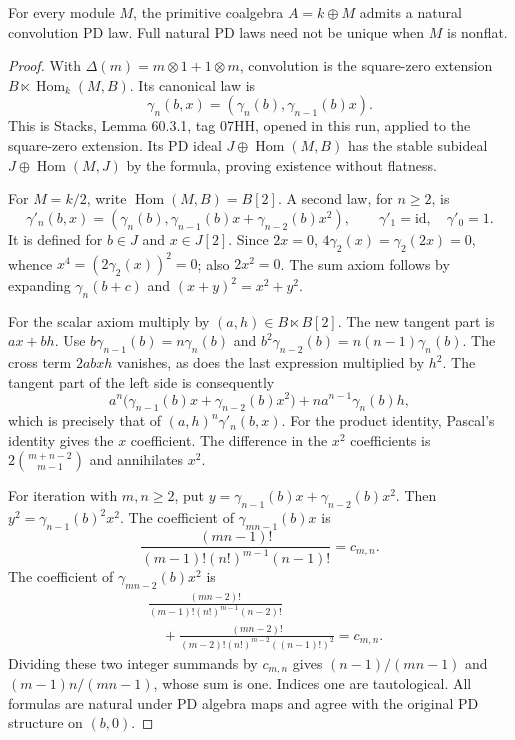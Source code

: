 \begin{theorem}
\label{sa08:D011}
For every module $M$, the primitive coalgebra $A=k\oplus M$ admits
a natural convolution PD law. Full natural PD laws need not be
unique when $M$ is nonflat.
\end{theorem}
\begin{proof}
With $\Delta(m)=m\otimes1+1\otimes m$, convolution is the
square-zero extension $B\ltimes\operatorname{Hom}_k(M,B)$.
Its canonical law is
\[
 \gamma_n(b,x)=(\gamma_n(b),\gamma_{n-1}(b)x).
\]
This is Stacks, Lemma 60.3.1, tag 07HH, opened in this run, applied
to the square-zero extension. Its PD ideal
$J\oplus\operatorname{Hom}(M,B)$ has the stable subideal
$J\oplus\operatorname{Hom}(M,J)$ by the formula, proving existence
without flatness.

For $M=k/2$, write $\operatorname{Hom}(M,B)=B[2]$. A second law,
for $n\geq2$, is
\[
 \gamma'_n(b,x)=
 (\gamma_n(b),\gamma_{n-1}(b)x+\gamma_{n-2}(b)x^2),
 \qquad \gamma'_1=\mathrm{id},\quad\gamma'_0=1.
\]
It is defined for $b\in J$ and $x\in J[2]$. Since $2x=0$,
$4\gamma_2(x)=\gamma_2(2x)=0$, whence
$x^4=(2\gamma_2(x))^2=0$; also $2x^2=0$.
The sum axiom follows by expanding $\gamma_n(b+c)$ and
$(x+y)^2=x^2+y^2$.

For the scalar axiom multiply by $(a,h)\in B\ltimes B[2]$.
The new tangent part is $ax+bh$.
Use $b\gamma_{n-1}(b)=n\gamma_n(b)$ and
$b^2\gamma_{n-2}(b)=n(n-1)\gamma_n(b)$.
The cross term $2abxh$ vanishes, as does the last expression
multiplied by $h^2$. The tangent part of the left side is consequently
\[
 a^n\bigl(\gamma_{n-1}(b)x+\gamma_{n-2}(b)x^2\bigr)
       +na^{n-1}\gamma_n(b)h,
\]
which is precisely that of $(a,h)^n\gamma'_n(b,x)$.
For the product identity, Pascal's identity gives the $x$
coefficient. The difference in the $x^2$ coefficients is
$2\binom{m+n-2}{m-1}$ and annihilates $x^2$.

For iteration with $m,n\geq2$, put
$y=\gamma_{n-1}(b)x+\gamma_{n-2}(b)x^2$.
Then $y^2=\gamma_{n-1}(b)^2x^2$.
The coefficient of $\gamma_{mn-1}(b)x$ is
\[
 \frac{(mn-1)!}{(m-1)!(n!)^{m-1}(n-1)!}=c_{m,n}.
\]
The coefficient of $\gamma_{mn-2}(b)x^2$ is
\begin{align*}
 &\frac{(mn-2)!}{(m-1)!(n!)^{m-1}(n-2)!}\\
 &\hspace{1em}+\frac{(mn-2)!}{(m-2)!(n!)^{m-2}((n-1)!)^2}
 =c_{m,n}.
\end{align*}
Dividing these two integer summands by $c_{m,n}$ gives
$(n-1)/(mn-1)$ and $(m-1)n/(mn-1)$, whose sum is one.
Indices one are tautological. All formulas are natural under PD
algebra maps and agree with the original PD structure on $(b,0)$.


\end{proof}
